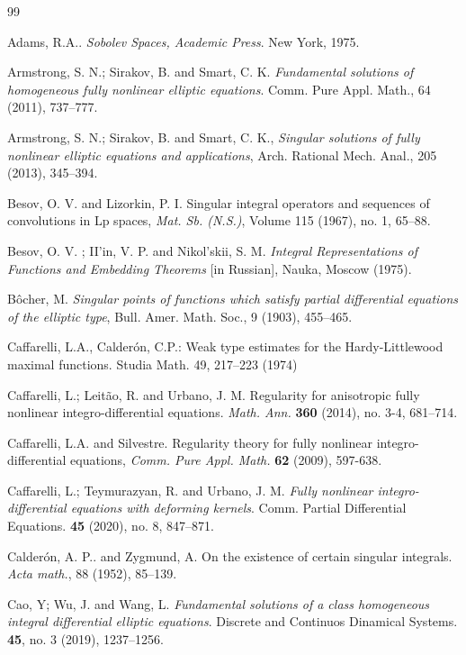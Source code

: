 \documentclass[10pt, leqno]{article}
\theoremstyle{definition}
\theoremstyle{remark}
\numberwithin{equation}{section}
\begin{document}
\begin{thebibliography}{99}
\parskip=0.7pt

 Adams, R.A.. \textit{Sobolev Spaces, Academic Press}. New York, 1975.

 Armstrong, S. N.; Sirakov, B. and Smart, C. K. \textit{Fundamental solutions of homogeneous fully nonlinear elliptic equations}. Comm. Pure Appl. Math., 64 (2011), 737--777.

 Armstrong, S. N.; Sirakov, B. and Smart, C. K., \textit{Singular solutions of fully nonlinear elliptic equations and applications}, Arch. Rational Mech. Anal., 205 (2013), 345--394.

 Besov, O. V. and Lizorkin, P. I. Singular integral operators and sequences of convolutions in Lp spaces, \textit{Mat. Sb. (N.S.)}, Volume 115 (1967), no. 1, 65--88.

 Besov, O. V. ; II'in, V. P. and Nikol'skii, S. M. \textit{Integral Representations of Functions and Embedding Theorems} [in
Russian], Nauka, Moscow (1975).

 B\^ocher, M. \textit{Singular points of functions which satisfy partial differential equations of the elliptic type}, Bull. Amer. Math. Soc., 9 (1903), 455--465.


 Caffarelli, L.A., Calder\' on, C.P.: Weak type estimates for the Hardy-Littlewood maximal functions. Studia Math. 49, 217--223 (1974)

 Caffarelli, L.; Leit\~ao, R. and Urbano, J. M. Regularity for anisotropic fully nonlinear
integro-differential equations. \textit{Math. Ann.} \textbf{360} (2014), no. 3-4, 681--714.

 Caffarelli, L.A. and Silvestre. Regularity theory for fully nonlinear
integro-differential equations, {\it Comm. Pure Appl. Math.} \textbf{62} (2009), 597-638.

 Caffarelli, L.; Teymurazyan, R. and Urbano, J. M. \textit{ Fully nonlinear
integro-differential equations with deforming kernels}. Comm. Partial Differential Equations. \textbf{45} (2020), no. 8, 847--871.

 Calder\' on, A. P.. and Zygmund, A. On the existence of certain singular integrals. \textit{Acta math.}, 88 (1952), 85--139.

 Cao, Y; Wu, J. and Wang, L. \textit{Fundamental solutions of a class homogeneous integral differential elliptic equations}. Discrete and Continuos Dinamical Systems. \textbf{45}, no. 3 (2019), 1237--1256.


\end{thebibliography}
\end{document}
